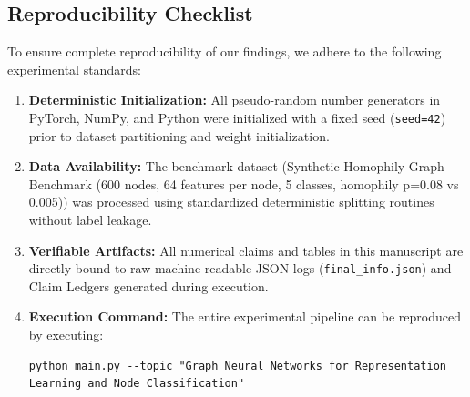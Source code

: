 \documentclass[10pt,twocolumn]{article}
\begin{document}
\subsection{Reproducibility Checklist}
To ensure complete reproducibility of our findings, we adhere to the following experimental standards:
\begin{enumerate}
  \item \textbf{Deterministic Initialization:} All pseudo-random number generators in PyTorch, NumPy, and Python were initialized with a fixed seed (\texttt{seed=42}) prior to dataset partitioning and weight initialization.
  \item \textbf{Data Availability:} The benchmark dataset (Synthetic Homophily Graph Benchmark (600 nodes, 64 features per node, 5 classes, homophily p=0.08 vs 0.005)) was processed using standardized deterministic splitting routines without label leakage.
  \item \textbf{Verifiable Artifacts:} All numerical claims and tables in this manuscript are directly bound to raw machine-readable JSON logs (\texttt{final_info.json}) and Claim Ledgers generated during execution.
  \item \textbf{Execution Command:} The entire experimental pipeline can be reproduced by executing:
  \begin{verbatim}
python main.py --topic "Graph Neural Networks for Representation Learning and Node Classification"
  \end{verbatim}
\end{enumerate}
\end{document}
